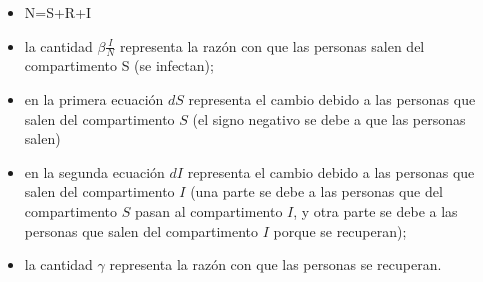 \documentclass[
]{article}
\begin{document}
\begin{itemize}
\item
  N=S+R+I
\item
  la cantidad \(\beta\frac{I}{N}\) representa la razón con que las
  personas salen del compartimento S (se infectan);
\item
  en la primera ecuación \(dS\) representa el cambio debido a las
  personas que salen del compartimento \(S\) (el signo negativo se debe
  a que las personas salen)
\item
  en la segunda ecuación \(dI\) representa el cambio debido a las
  personas que salen del compartimento \(I\) (una parte se debe a las
  personas que del compartimento \(S\) pasan al compartimento \(I\), y
  otra parte se debe a las personas que salen del compartimento \(I\)
  porque se recuperan);
\item
  la cantidad \(\gamma\) representa la razón con que las personas se
  recuperan.
\end{itemize}
\end{document}
